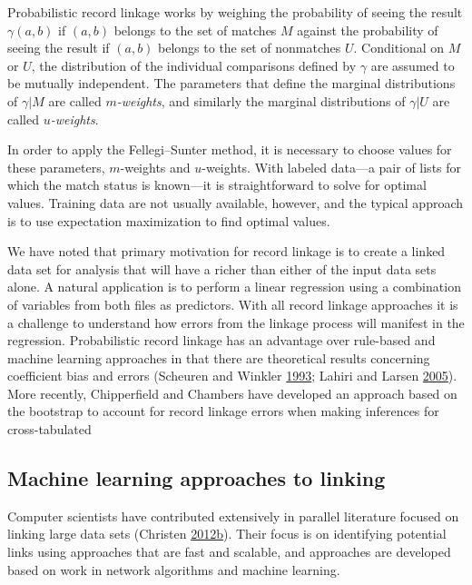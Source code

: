 \documentclass[]{krantz}
\begin{document}
Probabilistic record linkage works by weighing the probability of seeing
the result \(\gamma(a, b)\) if \((a, b)\) belongs to the set of matches
\(M\) against the probability of seeing the result if \((a, b)\) belongs
to the set of nonmatches \(U\). Conditional on \(M\) or \(U\), the
distribution of the individual comparisons defined by \(\gamma\) are
assumed to be mutually independent. The parameters that define the
marginal distributions of \(\gamma | M\) are called
\emph{\(m\)-weights}, and similarly the marginal distributions of
\(\gamma | U\) are called \emph{\(u\)-weights}.

In order to apply the Fellegi--Sunter method, it is necessary to choose
values for these parameters, \(m\)-weights and \(u\)-weights. With
labeled data---a pair of lists for which the match status is known---it
is straightforward to solve for optimal values. Training data are not
usually available, however, and the typical approach is to use
expectation maximization to find optimal values.

We have noted that primary motivation for record linkage is to create a
linked data set for analysis that will have a richer than either of the
input data sets alone. A natural application is to perform a linear
regression using a combination of variables from both files as
predictors. With all record linkage approaches it is a challenge to
understand how errors from the linkage process will manifest in the
regression. Probabilistic record linkage has an advantage over
rule-based and machine learning approaches in that there are theoretical
results concerning coefficient bias and errors (Scheuren and Winkler
\protect\hyperlink{ref-scheuren1993regression}{1993}; Lahiri and Larsen
\protect\hyperlink{ref-lahiri2005regression}{2005}). More recently,
Chipperfield and Chambers have developed an approach based on the
bootstrap to account for record linkage errors when making inferences
for cross-tabulated

\subsection{Machine learning approaches to
linking}\label{machine-learning-approaches-to-linking}

Computer scientists have contributed extensively in parallel literature
focused on linking large data sets (Christen
\protect\hyperlink{ref-christen2012data}{2012}\protect\hyperlink{ref-christen2012data}{b}).
Their focus is on identifying potential links using approaches that are
fast and scalable, and approaches are developed based on work in network
algorithms and machine learning.
\end{document}
